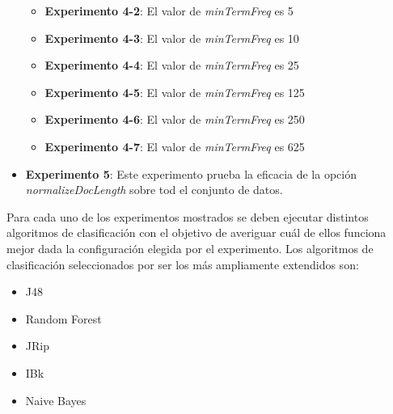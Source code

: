 \documentclass[12pt,a4paper, xcolor=table]{article}
\begin{document}
\begin{itemize}
\begin{itemize}
            \item \textbf{Experimento 4-2}: El valor de \textit{minTermFreq} es 5
            \item \textbf{Experimento 4-3}: El valor de \textit{minTermFreq} es 10
            \item \textbf{Experimento 4-4}: El valor de \textit{minTermFreq} es 25
            \item \textbf{Experimento 4-5}: El valor de \textit{minTermFreq} es 125
            \item \textbf{Experimento 4-6}: El valor de \textit{minTermFreq} es 250
            \item \textbf{Experimento 4-7}: El valor de \textit{minTermFreq} es 625
          \end{itemize}
          \item \textbf{Experimento 5}: Este experimento prueba la eficacia de la opción \textit{normalizeDocLength} sobre tod el conjunto de datos.

        \end{itemize}

        Para cada uno de los experimentos mostrados se deben ejecutar distintos algoritmos de clasificación con el objetivo de averiguar cuál de ellos funciona mejor dada la configuración elegida por el experimento. Los algoritmos de clasificación seleccionados por ser los más ampliamente extendidos son:
    
        \begin{itemize}
        \item J48
        \item Random Forest
        \item JRip
        \item IBk
        \item Naive Bayes
        \end{itemize}
\end{document}
